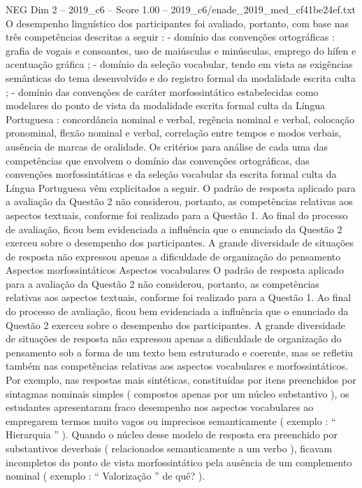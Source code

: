 \begin{textsample}{NEG Dim 2 – 2019\_c6 – Score 1.00 – 2019\_c6/enade\_2019\_med\_cf41be24ef.txt}
O desempenho linguístico dos participantes foi avaliado, portanto, com base nas três competências descritas a seguir : - domínio das convenções ortográficas : grafia de vogais e consoantes, uso de maiúsculas e minúsculas, emprego do hífen e acentuação gráfica ; - domínio da seleção vocabular, tendo em vista as exigências semânticas do tema desenvolvido e do registro formal da modalidade escrita culta ; - domínio das convenções de caráter morfossintático estabelecidas como modelares do ponto de vista da modalidade escrita formal culta da Língua Portuguesa : concordância nominal e verbal, regência nominal e verbal, colocação pronominal, flexão nominal e verbal, correlação entre tempos e modos verbais, ausência de marcas de oralidade.
Os critérios para análise de cada uma das competências que envolvem o domínio das convenções ortográficas, das convenções morfossintáticas e da seleção vocabular da escrita formal culta da Língua Portuguesa vêm explicitados a seguir.
O padrão de resposta aplicado para a avaliação da Questão 2 não considerou, portanto, as competências relativas aos aspectos textuais, conforme foi realizado para a Questão 1.
Ao final do processo de avaliação, ficou bem evidenciada a influência que o enunciado da Questão 2 exerceu sobre o desempenho dos participantes.
A grande diversidade de situações de resposta não expressou apenas a dificuldade de organização do pensamento Aspectos morfossintáticos Aspectos vocabulares O padrão de resposta aplicado para a avaliação da Questão 2 não considerou, portanto, as competências relativas aos aspectos textuais, conforme foi realizado para a Questão 1.
Ao final do processo de avaliação, ficou bem evidenciada a influência que o enunciado da Questão 2 exerceu sobre o desempenho dos participantes.
A grande diversidade de situações de resposta não expressou apenas a dificuldade de organização do pensamento sob a forma de um texto bem estruturado e coerente, mas se refletiu também nas competências relativas aos aspectos vocabulares e morfossintáticos.
Por exemplo, nas respostas mais sintéticas, constituídas por itens preenchidos por sintagmas nominais simples ( compostos apenas por um núcleo substantivo ), os estudantes apresentaram fraco desempenho nos aspectos vocabulares ao empregarem termos muito vagos ou imprecisos semanticamente ( exemplo : “ Hierarquia ” ).
Quando o núcleo desse modelo de resposta era preenchido por substantivos deverbais ( relacionados semanticamente a um verbo ), ficavam incompletos do ponto de vista morfossintático pela ausência de um complemento nominal ( exemplo : “ Valorização ” de quê? ).

\end{textsample}
